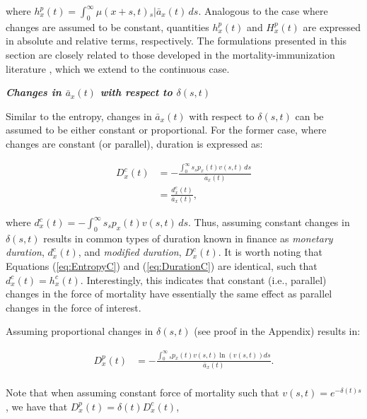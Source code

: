 \documentclass[12pt]{article}
\begin{document}
where ${h}^{p}_{x}(t)=\int_0^\infty \mu(x+s,t)   {}_s|\bar{a}_x(t) \, ds$. Analogous to the case where changes are assumed to be constant, quantities ${h}^{p}_{x}(t)$ and ${H}^{p}_{x}(t)$ are expressed in absolute and relative terms, respectively. The formulations presented in this section are closely related to those developed in the mortality-immunization literature \citep{Tsai2013a,Lin2020}, which we extend to the continuous case.



\textbf{\textit{{Changes in $\bar{a}_x(t)$ with respect to $\delta(s,t)$}}}


Similar to the entropy, changes in $\bar{a}_x(t)$ with respect to $\delta(s,t)$ can be assumed to be either constant or proportional. For the former case, where changes are constant (or parallel), duration is expressed as:

\begin{equation}\label{eq:DurationC}
	\begin{split}
		{D}^{c}_x(t) &= -\frac{\int_0^\infty s {}_s p_x(t) {v}(s,t) \, ds}{\bar{a}_x(t)} \\
		&= \frac{{d}^{c}_x(t)}{\bar{a}_x(t)},
	\end{split}
\end{equation}

where ${d}^{c}_x(t) = -\int_0^\infty s {}_s p_x(t) {v}(s,t) \, ds$. Thus, assuming constant changes in $\delta(s,t)$ results in common types of duration known in finance as \textit{monetary duration}, ${d}^{c}_x(t)$, and \textit{modified duration}, ${D}^{c}_x(t)$. It is worth noting that Equations (\ref{eq:EntropyC}) and (\ref{eq:DurationC}) are identical, such that ${d}^{c}_x(t) = {h}^{c}_{x}(t)$. Interestingly, this indicates that constant (i.e., parallel) changes in the force of mortality have essentially the same effect as parallel changes in the force of interest.

Assuming proportional changes in $\delta(s,t)$ (see proof in the Appendix) results in: 


\begin{equation}\label{eq:DurationP}
\begin{split}
{D}^{p}_{x}(t) &= -\frac{\int_0^\infty {}_sp_x(t) v(s,t) \ln(v(s,t))ds}{\bar{a}_x(t)}. \\
\end{split}
\end{equation}


Note that when assuming constant force of mortality such that $v(s,t)=e^{-\delta(t)s}$, we have that ${D}^{p}_{x}(t)=\delta(t){D}^{c}_{x}(t)$,
\end{document}
